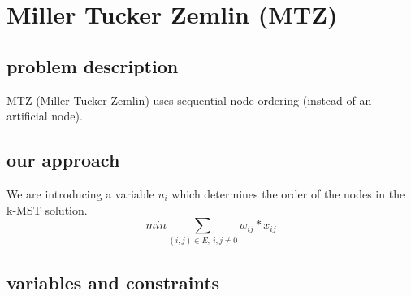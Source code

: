 \section{Miller Tucker Zemlin (MTZ)}
\subsection{problem description}
MTZ (Miller Tucker Zemlin) uses sequential node ordering (instead of an artificial node). 

\subsection{our approach}
We are introducing a variable $u_i$ which determines the order of the nodes in the k-MST solution.\\

\begin{equation}
  min \sum_{(i,j) \in E , \ i,j \not = 0} {w_{ij} * x_{ij}}
\end{equation}


\subsection{variables and constraints}

